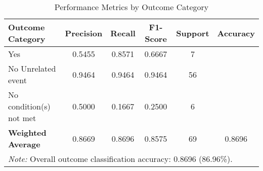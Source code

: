 \begin{table}[H]
\centering
\caption{Performance Metrics by Outcome Category}
\label{tab:classification_metrics}
\begin{tabular}{lccccc}
\toprule
\textbf{Outcome Category} & \textbf{Precision} & \textbf{Recall} & \textbf{F1-Score} & \textbf{Support} & \textbf{Accuracy} \\
\midrule
Yes & 0.5455 & 0.8571 & 0.6667 & 7 & \multirow{1}{*}{} \\
No \- Unrelated event & 0.9464 & 0.9464 & 0.9464 & 56 & \multirow{1}{*}{} \\
No \- condition(s) not met & 0.5000 & 0.1667 & 0.2500 & 6 & \multirow{1}{*}{} \\
\midrule
\textbf{Weighted Average} & 0.8669 & 0.8696 & 0.8575 & 69 & 0.8696 \\
\bottomrule
\multicolumn{6}{p{14cm}}{\textit{Note:} Overall outcome classification accuracy: 0.8696 (86.96\%).} \\
\end{tabular}
\end{table}
